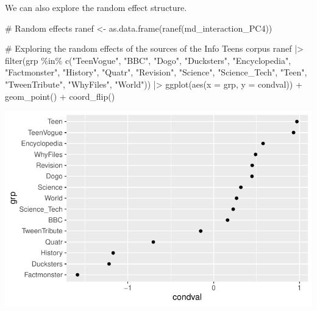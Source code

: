 \documentclass[
  letterpaper,
  DIV=11,
  numbers=noendperiod]{scrreprt}
\newenvironment{Shaded}{\begin{snugshade}}{\end{snugshade}}
\newcommand{\AttributeTok}[1]{\textcolor[rgb]{0.40,0.45,0.13}{#1}}
\newcommand{\CommentTok}[1]{\textcolor[rgb]{0.37,0.37,0.37}{#1}}
\newcommand{\FunctionTok}[1]{\textcolor[rgb]{0.28,0.35,0.67}{#1}}
\newcommand{\NormalTok}[1]{\textcolor[rgb]{0.00,0.23,0.31}{#1}}
\newcommand{\OtherTok}[1]{\textcolor[rgb]{0.00,0.23,0.31}{#1}}
\newcommand{\SpecialCharTok}[1]{\textcolor[rgb]{0.37,0.37,0.37}{#1}}
\newcommand{\StringTok}[1]{\textcolor[rgb]{0.13,0.47,0.30}{#1}}
\begin{document}
We can also explore the random effect structure.

\begin{Shaded}
\begin{Highlighting}[]
\CommentTok{\# Random effects}
\NormalTok{ranef }\OtherTok{\textless{}{-}} \FunctionTok{as.data.frame}\NormalTok{(}\FunctionTok{ranef}\NormalTok{(md\_interaction\_PC4))}

\CommentTok{\# Exploring the random effects of the sources of the Info Teens corpus}
\NormalTok{ranef }\SpecialCharTok{|\textgreater{}} 
  \FunctionTok{filter}\NormalTok{(grp }\SpecialCharTok{\%in\%} \FunctionTok{c}\NormalTok{(}\StringTok{"TeenVogue"}\NormalTok{, }\StringTok{"BBC"}\NormalTok{, }\StringTok{"Dogo"}\NormalTok{, }\StringTok{"Ducksters"}\NormalTok{, }\StringTok{"Encyclopedia"}\NormalTok{, }\StringTok{"Factmonster"}\NormalTok{, }\StringTok{"History"}\NormalTok{, }\StringTok{"Quatr"}\NormalTok{, }\StringTok{"Revision"}\NormalTok{, }\StringTok{"Science"}\NormalTok{, }\StringTok{"Science\_Tech"}\NormalTok{, }\StringTok{"Teen"}\NormalTok{, }\StringTok{"TweenTribute"}\NormalTok{, }\StringTok{"WhyFiles"}\NormalTok{, }\StringTok{"World"}\NormalTok{)) }\SpecialCharTok{|\textgreater{}} 
  \FunctionTok{ggplot}\NormalTok{(}\FunctionTok{aes}\NormalTok{(}\AttributeTok{x =}\NormalTok{ grp, }\AttributeTok{y =}\NormalTok{ condval)) }\SpecialCharTok{+}
  \FunctionTok{geom\_point}\NormalTok{() }\SpecialCharTok{+}
  \FunctionTok{coord\_flip}\NormalTok{()}
\end{Highlighting}
\end{Shaded}

\includegraphics{AppendixH_files/figure-pdf/unnamed-chunk-20-1.pdf}

\begin{Shaded}
\end{Shaded}
\end{document}
